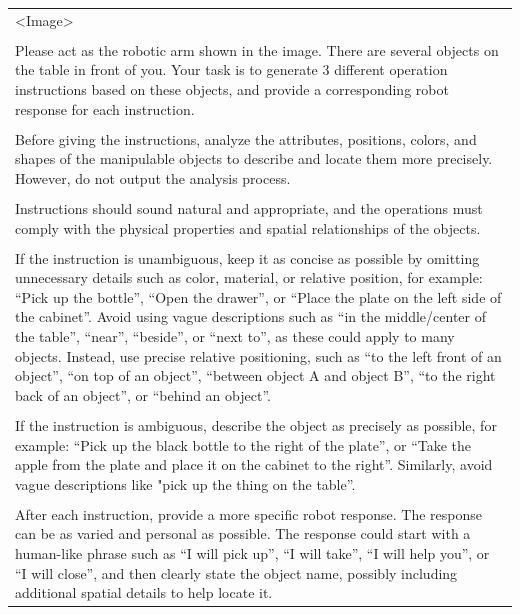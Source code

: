 \begin{table}[h!]\centering
\begin{minipage}{0.99\columnwidth}\vspace{0mm}    \centering
\begin{tcolorbox}
    \centering
   
     \hspace{-4mm}
      \scriptsize
    \begin{tabular}{p{}}
\textless Image\textgreater \\
\\
Please act as the robotic arm shown in the image. There are several objects on the table in front of you. Your task is to generate 3 different operation instructions based on these objects, and provide a corresponding robot response for each instruction. \\
\\
Before giving the instructions, analyze the attributes, positions, colors, and shapes of the manipulable objects to describe and locate them more precisely. However, do not output the analysis process. \\
\\
Instructions should sound natural and appropriate, and the operations must comply with the physical properties and spatial relationships of the objects. \\
\\
If the instruction is unambiguous, keep it as concise as possible by omitting unnecessary details such as color, material, or relative position, for example: ``Pick up the bottle'', ``Open the drawer'', or ``Place the plate on the left side of the cabinet''. Avoid using vague descriptions such as ``in the middle/center of the table'', ``near'', ``beside'', or ``next to'', as these could apply to many objects. Instead, use precise relative positioning, such as ``to the left front of an object'', ``on top of an object'', ``between object A and object B'', ``to the right back of an object'', or ``behind an object''. \\
\\
If the instruction is ambiguous, describe the object as precisely as possible, for example: ``Pick up the black bottle to the right of the plate'', or ``Take the apple from the plate and place it on the cabinet to the right''. Similarly, avoid vague descriptions like "pick up the thing on the table''. \\
\\
After each instruction, provide a more specific robot response. The response can be as varied and personal as possible. The response could start with a human-like phrase such as ``I will pick up'', ``I will take'', ``I will help you'', or ``I will close'', and then clearly state the object name, possibly including additional spatial details to help locate it. \\

\end{tabular}
\end{tcolorbox}
\end{minipage}
\end{table}
